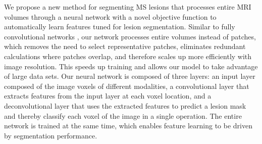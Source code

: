 We propose a new method for segmenting MS lesions that processes
entire MRI volumes through a neural network with a novel objective function to
automatically learn features tuned for lesion segmentation.
%
%
%
Similar to fully convolutional networks \cite{kang2014fully}, our network
processes entire volumes instead of patches, which removes
the need to select representative patches, eliminates redundant calculations
where patches overlap, and therefore scales up more efficiently with image
resolution. This speeds up training and allows our model to take advantage of
large data sets.
%
%
Our neural network is composed of three layers: an input layer composed of the
image voxels of different modalities, a convolutional layer \cite{LeCun1998}
that extracts features from the input layer at each voxel location, and a
deconvolutional layer \cite{zeiler2011} that uses the extracted features to
predict a lesion mask and thereby classify each voxel of the image in a single
operation. The entire network is trained at the same time, which enables feature
learning to be driven by segmentation performance.
%
% 
